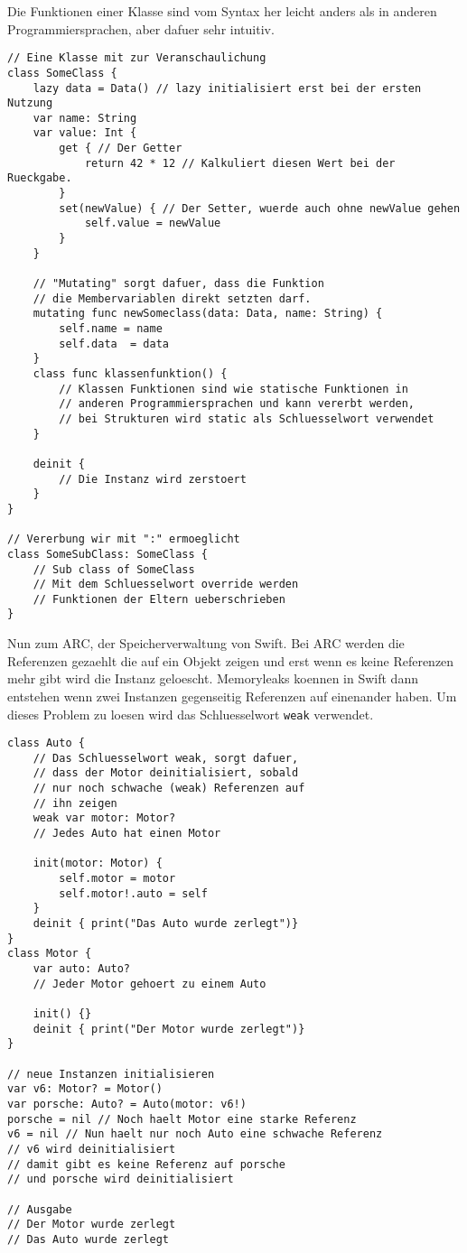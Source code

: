 Die Funktionen einer Klasse sind vom Syntax her leicht anders als in anderen Programmiersprachen, aber dafuer sehr intuitiv. 
\begin{lstlisting}
// Eine Klasse mit zur Veranschaulichung 
class SomeClass {
	lazy data = Data() // lazy initialisiert erst bei der ersten Nutzung
	var name: String
	var value: Int {
		get { // Der Getter
			return 42 * 12 // Kalkuliert diesen Wert bei der Rueckgabe.
		}
		set(newValue) { // Der Setter, wuerde auch ohne newValue gehen
			self.value = newValue
		}	
	} 

	// "Mutating" sorgt dafuer, dass die Funktion 
	// die Membervariablen direkt setzten darf.
	mutating func newSomeclass(data: Data, name: String) {
		self.name = name
		self.data  = data
	}
	class func klassenfunktion() {
		// Klassen Funktionen sind wie statische Funktionen in 
		// anderen Programmiersprachen und kann vererbt werden, 
		// bei Strukturen wird static als Schluesselwort verwendet
	}

	deinit {
		// Die Instanz wird zerstoert
	}
}

// Vererbung wir mit ":" ermoeglicht
class SomeSubClass: SomeClass {
	// Sub class of SomeClass
	// Mit dem Schluesselwort override werden 
	// Funktionen der Eltern ueberschrieben
}
\end{lstlisting}
Nun zum ARC, der Speicherverwaltung von Swift. Bei ARC werden die Referenzen gezaehlt die auf ein Objekt zeigen und erst wenn es keine Referenzen mehr gibt wird die Instanz geloescht. Memoryleaks koennen in Swift dann entstehen wenn zwei Instanzen gegenseitig Referenzen auf einenander haben. Um dieses Problem zu loesen wird das Schluesselwort \lstinline{weak} verwendet.
\begin{lstlisting}
class Auto {
    // Das Schluesselwort weak, sorgt dafuer,
    // dass der Motor deinitialisiert, sobald
    // nur noch schwache (weak) Referenzen auf
    // ihn zeigen
    weak var motor: Motor? 
    // Jedes Auto hat einen Motor
    
    init(motor: Motor) {
        self.motor = motor
        self.motor!.auto = self
    }
    deinit { print("Das Auto wurde zerlegt")}
}
class Motor {
    var auto: Auto? 
    // Jeder Motor gehoert zu einem Auto

    init() {}
    deinit { print("Der Motor wurde zerlegt")}
}

// neue Instanzen initialisieren
var v6: Motor? = Motor()
var porsche: Auto? = Auto(motor: v6!)
porsche = nil // Noch haelt Motor eine starke Referenz
v6 = nil // Nun haelt nur noch Auto eine schwache Referenz
// v6 wird deinitialisiert
// damit gibt es keine Referenz auf porsche
// und porsche wird deinitialisiert

// Ausgabe
// Der Motor wurde zerlegt
// Das Auto wurde zerlegt
\end{lstlisting}
